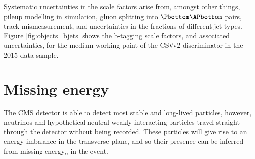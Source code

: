 Systematic uncertainties in the scale factors arise from, amongst other things,
pileup modelling in simulation, gluon splitting into $\Pbottom\APbottom$ pairs, track mismeasurement,
and uncertainties in the fractions of different jet types.
Figure \ref{fig:objects_bjets} shows the b-tagging scale factors, and associated uncertainties,
for the medium working point of the \ac{CSV}v2 discriminator in the
2015 data sample.

\section{Missing energy}
\label{sec:objects_met}
The \ac{CMS} detector is able to detect most stable and long-lived particles,
however, neutrinos and hypothetical neutral weakly interacting particles
travel straight through the detector without being recorded. These particles
will give rise to an energy imbalance in the transverse plane, and so their
presence can be inferred from missing energy,\MET, in the event. 


